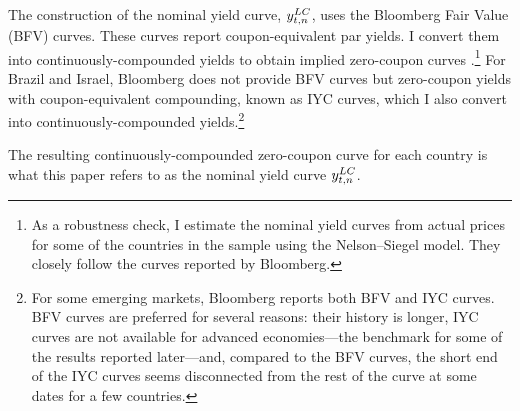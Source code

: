 {The construction of the nominal yield curve, \(y_{t,n} ^{LC}\), uses the Bloomberg Fair Value (BFV) curves.
These curves report coupon-equivalent par yields. I convert them into continuously-compounded yields to obtain implied zero-coupon curves
\citep[see][]{GSW:2007}.\footnote{As a robustness check, I estimate the nominal yield curves from actual prices for some of the countries in the sample using the Nelson--Siegel model. They closely follow the curves reported by Bloomberg.} %
For Brazil and Israel, Bloomberg does not provide BFV curves but zero-coupon yields with coupon-equivalent compounding, known as IYC curves, which I also convert into continuously-compounded yields.\footnote{ For some emerging markets, Bloomberg reports both BFV and IYC curves. BFV curves are preferred for several reasons: their history is longer, IYC curves are not available for advanced economies---the benchmark for some of the results reported later---and, compared to the BFV curves, the short end of the IYC curves seems disconnected from the rest of the curve at some dates for a few countries.} 

The resulting continuously-compounded zero-coupon curve for each country is what this paper refers to as the nominal yield curve \(y_{t,n} ^{LC}\).


}
